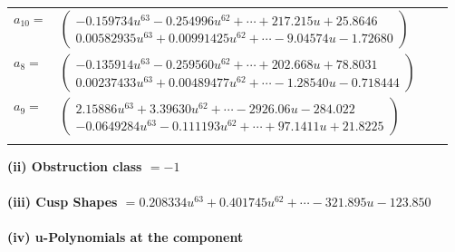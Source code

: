 \documentclass[1p]{elsarticle_modified}
\theoremstyle{definition}
\begin{document}
\begin{tabular}{m{7pt} m{180pt} m{7pt} m{180pt} }
\flushright $a_{10}=$&$\begin{pmatrix}-0.159734 u^{63}-0.254996 u^{62}+\cdots+217.215 u+25.8646\\0.00582935 u^{63}+0.00991425 u^{62}+\cdots-9.04574 u-1.72680\end{pmatrix}$ \\
\flushright $a_{8}=$&$\begin{pmatrix}-0.135914 u^{63}-0.259560 u^{62}+\cdots+202.668 u+78.8031\\0.00237433 u^{63}+0.00489477 u^{62}+\cdots-1.28540 u-0.718444\end{pmatrix}$ \\
\flushright $a_{9}=$&$\begin{pmatrix}2.15886 u^{63}+3.39630 u^{62}+\cdots-2926.06 u-284.022\\-0.0649284 u^{63}-0.111193 u^{62}+\cdots+97.1411 u+21.8225\end{pmatrix}$\\&\end{tabular}
\flushleft \textbf{(ii) Obstruction class $= -1$}\\~\\
\flushleft \textbf{(iii) Cusp Shapes $= 0.208334 u^{63}+0.401745 u^{62}+\cdots-321.895 u-123.850$}\\~\\
\newpage\renewcommand{\arraystretch}{1}
\flushleft \textbf{(iv) u-Polynomials at the component}\newline \\
\end{document}
